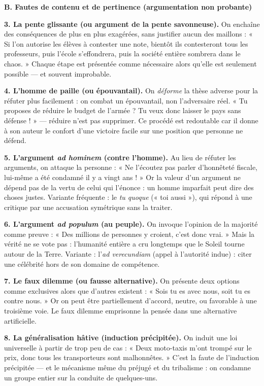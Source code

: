 \documentclass[11pt]{article}
\begin{document}
\textbf{B. Fautes de contenu et de pertinence (argumentation non probante)}

\textbf{3. La pente glissante (ou argument de la pente savonneuse).} On enchaîne des conséquences de plus en plus exagérées, sans justifier aucun des maillons : « Si l'on autorise les élèves à contester une note, bientôt ils contesteront tous les professeurs, puis l'école s'effondrera, puis la société entière sombrera dans le chaos. » Chaque étape est présentée comme nécessaire alors qu'elle est seulement possible — et souvent improbable.

\textbf{4. L'homme de paille (ou épouvantail).} On \emph{déforme} la thèse adverse pour la réfuter plus facilement : on combat un épouvantail, non l'adversaire réel. « Tu proposes de réduire le budget de l'armée ? Tu veux donc laisser le pays sans défense ! » — réduire n'est pas supprimer. Ce procédé est redoutable car il donne à son auteur le confort d'une victoire facile sur une position que personne ne défend.

\textbf{5. L'argument \emph{ad hominem} (contre l'homme).} Au lieu de réfuter les arguments, on attaque la personne : « Ne l'écoutez pas parler d'honnêteté fiscale, lui-même a été condamné il y a vingt ans ! » Or la valeur d'un argument ne dépend pas de la vertu de celui qui l'énonce : un homme imparfait peut dire des choses justes. Variante fréquente : le \emph{tu quoque} (« toi aussi »), qui répond à une critique par une accusation symétrique sans la traiter.

\textbf{6. L'argument \emph{ad populum} (au peuple).} On invoque l'opinion de la majorité comme preuve : « Des millions de personnes y croient, c'est donc vrai. » Mais la vérité ne se vote pas : l'humanité entière a cru longtemps que le Soleil tourne autour de la Terre. Variante : l'\emph{ad verecundiam} (appel à l'autorité indue) : citer une célébrité hors de son domaine de compétence.

\textbf{7. Le faux dilemme (ou fausse alternative).} On présente deux options comme exclusives alors que d'autres existent : « Sois tu es avec nous, soit tu es contre nous. » Or on peut être partiellement d'accord, neutre, ou favorable à une troisième voie. Le faux dilemme emprisonne la pensée dans une alternative artificielle.

\textbf{8. La généralisation hâtive (induction précipitée).} On induit une loi universelle à partir de trop peu de cas : « Deux moto-taxis m'ont trompé sur le prix, donc tous les transporteurs sont malhonnêtes. » C'est la faute de l'induction précipitée — et le mécanisme même du préjugé et du tribalisme : on condamne un groupe entier sur la conduite de quelques-uns.
\end{document}
